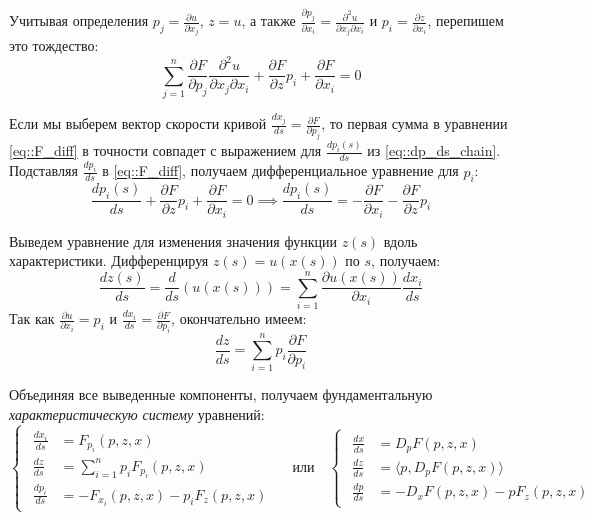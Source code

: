 Учитывая определения $p_j = \frac{\partial u}{\partial x_j}$, $z = u$, а также $\frac{\partial p_j}{\partial x_i} = \frac{\partial^2 u}{\partial x_j \partial x_i}$ и $p_i = \frac{\partial z}{\partial x_i}$, перепишем это тождество:
\begin{equation} \label{eq::F_diff}
\sum_{j=1}^n \frac{\partial F}{\partial p_j} \frac{\partial^2 u}{\partial x_j \partial x_i} + \frac{\partial F}{\partial z} p_i + \frac{\partial F}{\partial x_i} = 0
\end{equation}

Если мы выберем вектор скорости кривой $\frac{dx_j}{ds} = \frac{\partial F}{\partial p_j}$, то первая сумма в уравнении \eqref{eq::F_diff} в точности совпадет с выражением для $\frac{dp_i(s)}{ds}$ из \eqref{eq::dp_ds_chain}. Подставляя $\frac{dp_i}{ds}$ в \eqref{eq::F_diff}, получаем дифференциальное уравнение для $p_i$:
\begin{equation}
\frac{dp_i(s)}{ds} + \frac{\partial F}{\partial z} p_i + \frac{\partial F}{\partial x_i} = 0 \implies \frac{dp_i(s)}{ds} = -\frac{\partial F}{\partial x_i} - \frac{\partial F}{\partial z} p_i
\end{equation}

Выведем уравнение для изменения значения функции $z(s)$ вдоль характеристики. Дифференцируя $z(s) = u(x(s))$ по $s$, получаем:
\begin{equation}
\frac{dz(s)}{ds} = \frac{d}{ds}(u(x(s))) = \sum_{i=1}^n \frac{\partial u(x(s))}{\partial x_i} \frac{dx_i}{ds}
\end{equation}
Так как $\frac{\partial u}{\partial x_i} = p_i$ и $\frac{dx_i}{ds} = \frac{\partial F}{\partial p_i}$, окончательно имеем:
\begin{equation}
\frac{dz}{ds} = \sum_{i=1}^n p_i \frac{\partial F}{\partial p_i}
\end{equation}

Объединяя все выведенные компоненты, получаем фундаментальную \textit{характеристическую систему} уравнений:
\begin{equation} \label{eq::char_system}
\begin{cases}
\begin{aligned}
\frac{dx_i}{ds} &= F_{p_i}(p, z, x) \\
\frac{dz}{ds} &= \sum_{i=1}^n p_i F_{p_i}(p, z, x) \\
\frac{dp_i}{ds} &= -F_{x_i}(p, z, x) - p_i F_z(p, z, x)
\end{aligned}
\end{cases}
  \quad \text{или} \quad 
\begin{cases}
\begin{aligned}
    \frac{dx}{ds} &= D_p F(p, z, x) \\
    \frac{dz}{ds} &= \langle p, D_p F(p, z, x) \rangle \\
    \frac{dp}{ds} &= -D_x F(p, z, x) - p F_z(p, z, x)
\end{aligned}
\end{cases}
\end{equation}

